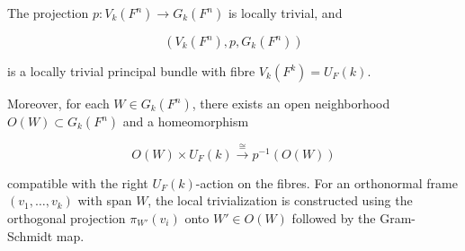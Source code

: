 The projection $p: V_k(F^n) \to G_k(F^n)$ is locally trivial, and

$$(V_k(F^n), p, G_k(F^n))$$

is a locally trivial principal bundle with fibre $V_k(F^k) = U_F(k)$.

Moreover, for each $W \in G_k(F^n)$, there exists an open neighborhood $O(W) \subset G_k(F^n)$ and a homeomorphism

$$O(W) \times U_F(k) \xrightarrow{\cong} p^{-1}(O(W))$$

compatible with the right $U_F(k)$-action on the fibres. For an orthonormal frame $(v_1, \ldots, v_k)$ with span $W$, the local trivialization is constructed using the orthogonal projection $\pi_{W'}(v_i)$ onto $W' \in O(W)$ followed by the Gram-Schmidt map.

